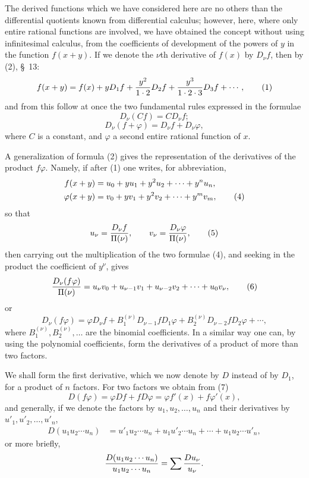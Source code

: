 \documentclass[11pt]{article}
\begin{document}
The derived functions which we have considered here are no others than the differential quotients known from differential calculus; however, here, where only entire rational functions are involved, we have obtained the concept without using infinitesimal calculus, from the coefficients of development of the powers of $y$ in the function $f(x+y)$. If we denote the $\nu$th derivative of $f(x)$ by $D_\nu f$, then by (2), \S~13:
\begin{equation}
 f(x+y)=f(x)+yD_1f+{y^2\over1\cdot2}D_2f+{y^3\over1\cdot2\cdot3}D_3f+\cdots,
\tag{1}
\end{equation}
and from this follow at once the two fundamental rules expressed in the formulae
\begin{equation}
 D_\nu(Cf)=C D_\nu f;
\tag{2}
\end{equation}
\begin{equation}
 D_\nu(f+\varphi)=D_\nu f+D_\nu\varphi,
\tag{3}
\end{equation}
where $C$ is a constant, and $\varphi$ a second entire rational function of $x$.

A generalization of formula (2) gives the representation of the derivatives of the product $f\varphi$. Namely, if after (1) one writes, for abbreviation,
\begin{align}
 f(x+y)&=u_0+yu_1+y^2u_2+\cdots+y^nu_n,\notag\\
 \varphi(x+y)&=v_0+yv_1+y^2v_2+\cdots+y^mv_m,
\tag{4}
\end{align}
so that
\begin{equation}
 u_\nu={D_\nu f\over\Pi(\nu)},\qquad
 v_\nu={D_\nu\varphi\over\Pi(\nu)},
\tag{5}
\end{equation}
then carrying out the multiplication of the two formulae (4), and seeking in the product the coefficient of $y^\nu$, gives
\begin{equation}
 {D_\nu(f\varphi)\over\Pi(\nu)}
 =u_\nu v_0+u_{\nu-1}v_1+u_{\nu-2}v_2+\cdots+u_0v_\nu,
\tag{6}
\end{equation}
or
\begin{equation}
 D_\nu(f\varphi)=\varphi D_\nu f+B_1^{(\nu)}D_{\nu-1}fD_1\varphi
 +B_2^{(\nu)}D_{\nu-2}fD_2\varphi+\cdots,
\tag{7}
\end{equation}
where $B_1^{(\nu)},B_2^{(\nu)},\ldots$ are the binomial coefficients. In a similar way one can, by using the polynomial coefficients, form the derivatives of a product of more than two factors.

We shall form the first derivative, which we now denote by $D$ instead of by $D_1$, for a product of $n$ factors. For two factors we obtain from (7)
\[
 D(f\varphi)=\varphi Df+fD\varphi=\varphi f'(x)+f\varphi'(x),
\]
and generally, if we denote the factors by $u_1,u_2,\ldots,u_n$ and their derivatives by $u'_1,u'_2,\ldots,u'_n$,
\begin{equation}
\begin{aligned}
D(u_1u_2\cdots u_n)
&=u'_1u_2\cdots u_n+u_1u'_2\cdots u_n+\cdots+u_1u_2\cdots u'_n,
\end{aligned}
\tag{8}
\end{equation}
or more briefly,
\[
 {D(u_1u_2\cdots u_n)\over u_1u_2\cdots u_n}
 =\sum {D u_\nu\over u_\nu}.
\]
\end{document}
